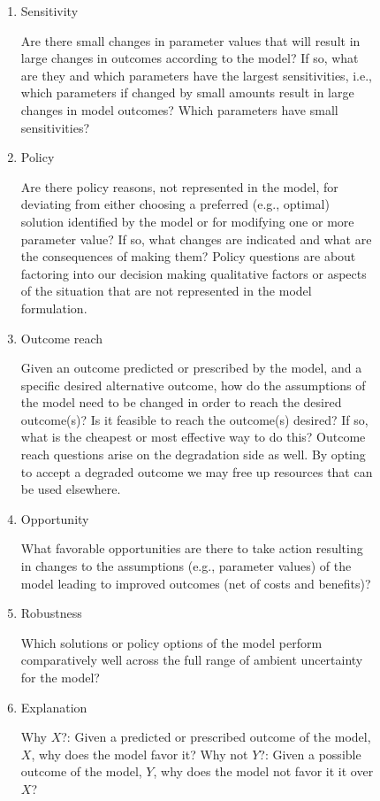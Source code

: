 \begin{figure}[h]
\figtop
\begin{enumerate}
\item Sensitivity

Are there small changes in parameter values that will result in large changes in outcomes according to the model?  If so, what are they and which parameters have the largest sensitivities, i.e., which parameters if changed by small amounts result in large changes in model outcomes? Which parameters have small sensitivities?

\item Policy


Are there policy reasons, not represented in the model, for deviating  from either choosing a preferred (e.g., optimal) solution identified by the model or for modifying one or more parameter value? If so, what changes are indicated and what are the consequences of making them? Policy questions are about factoring into our decision making qualitative factors or aspects of the situation that are not represented in the model formulation.


\item Outcome reach

Given an outcome predicted or prescribed by the model, and a specific desired alternative outcome, how do the assumptions of the model need to be changed in order to reach the desired outcome(s)? Is it feasible to reach the outcome(s) desired? If so, what is the cheapest or most effective way to do this? Outcome reach questions arise on the degradation side as well. By opting to accept a degraded outcome we may free up resources that can be used elsewhere.

\item Opportunity

What favorable opportunities are there to take action resulting in changes to the assumptions (e.g., parameter values) of the model leading to improved outcomes (net of costs and benefits)?

\item Robustness

Which solutions or policy options of the model perform comparatively well across the full range of ambient uncertainty for the model? %

\item Explanation

Why $X$?: Given a predicted or prescribed outcome of the model, $X$, why does the model favor it?  Why not $Y$?: Given a possible outcome of the model, $Y$, why does the model not favor it it over $X$?


\end{enumerate}
\end{figure}
